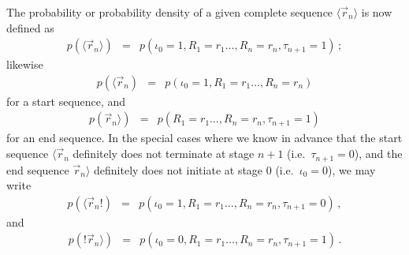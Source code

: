 \documentclass[a4paper]{article}
\begin{document}
The probability or probability density 
of a given complete sequence $\langle\vec{r}_n\rangle$ is now defined as
\begin{eqnarray}
p(\langle\vec{r}_n\rangle)
& = & p(\iota_0=1,R_1=r_1\ldots,R_n=r_n,\tau_{n+1}=1)\,;
\end{eqnarray}
likewise
\begin{eqnarray}
p(\langle\vec{r}_n)
& = & p(\iota_0=1,R_1=r_1\ldots,R_n=r_n)
\end{eqnarray}
for a start sequence, and
\begin{eqnarray}
p(\vec{r}_n\rangle)
& = & p(R_1=r_1\ldots,R_n=r_n,\tau_{n+1}=1)
\end{eqnarray}
for an end sequence.
In the special cases where we know in advance that the start sequence $\langle\vec{r}_n$ definitely does not terminate
at stage $n+1$ (i.e.\ $\tau_{n+1}=0$), and the end sequence $\vec{r}_n\rangle$ definitely does not initiate at stage
0 (i.e.\ $\iota_0=0$), we may write
\begin{eqnarray}
p(\langle\vec{r}_n!)
& = & p(\iota_0=1,R_1=r_1\ldots,R_n=r_n,\tau_{n+1}=0)\,,
\end{eqnarray}
and
\begin{eqnarray}
p(!\vec{r}_n\rangle)
& = & p(\iota_0=0,R_1=r_1\ldots,R_n=r_n,\tau_{n+1}=1)\,.
\end{eqnarray}
\end{document}
